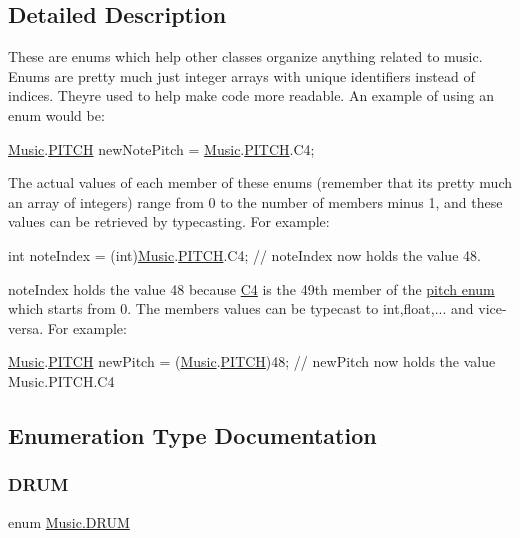 \subsection{Detailed Description}
These are enums which help other classes organize anything related to music. Enums are pretty much just integer arrays with unique identifiers instead of indices. They\textquotesingle{}re used to help make code more readable. An example of using an enum would be\+:
\begin{DoxyCode}
\hyperlink{class_music}{Music}.\hyperlink{group___music_enums_ga508f69b199ea518f935486c990edac1d}{PITCH} newNotePitch = \hyperlink{class_music}{Music}.\hyperlink{group___music_enums_ga508f69b199ea518f935486c990edac1d}{PITCH}.C4; 
\end{DoxyCode}
 The actual values of each member of these enums (remember that it\textquotesingle{}s pretty much an array of integers) range from 0 to the number of members minus 1, and these values can be retrieved by typecasting. For example\+: 
\begin{DoxyCode}
\textcolor{keywordtype}{int} noteIndex = (int)\hyperlink{class_music}{Music}.\hyperlink{group___music_enums_ga508f69b199ea518f935486c990edac1d}{PITCH}.C4; \textcolor{comment}{// noteIndex now holds the value 48. }
\end{DoxyCode}
 note\+Index holds the value 48 because \hyperlink{group___music_enums_gga508f69b199ea518f935486c990edac1dab713e6323a68d3ddabf4855826c50148}{C4} is the 49th member of the \hyperlink{group___music_enums_ga508f69b199ea518f935486c990edac1d}{pitch enum} which starts from 0. The members values can be typecast to int,float,... and vice-\/versa. For example\+: 
\begin{DoxyCode}
\hyperlink{class_music}{Music}.\hyperlink{group___music_enums_ga508f69b199ea518f935486c990edac1d}{PITCH} newPitch = (\hyperlink{class_music}{Music}.\hyperlink{group___music_enums_ga508f69b199ea518f935486c990edac1d}{PITCH})48; \textcolor{comment}{// newPitch now holds the value Music.PITCH.C4 }
\end{DoxyCode}
 

\subsection{Enumeration Type Documentation}
\mbox{\label{group___music_enums_gade475b4382c7066d1af13e7c13c029b6}} 
\subsubsection{\texorpdfstring{D\+R\+UM}{DRUM}}
{\footnotesize\ttfamily enum \hyperlink{group___music_enums_gade475b4382c7066d1af13e7c13c029b6}{Music.\+D\+R\+UM}\hspace{0.3cm}{\ttfamily [strong]}}



